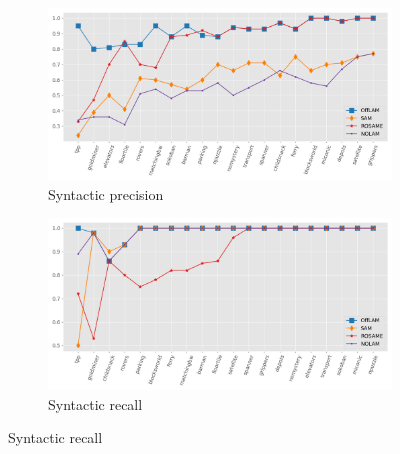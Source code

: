 
\begin{figure}[ht]
  \centering

  \begin{subfigure}[b]{0.45\textwidth}
    \includegraphics[width=\textwidth]{figures/10_traces/lineplots/syn_precision_line.png}
    \caption{Syntactic precision}
    \label{fig:syn-precision}
  \end{subfigure}
  \begin{subfigure}[b]{0.45\textwidth}
    \includegraphics[width=\textwidth]{figures/10_traces/lineplots/syn_recall_line.png}
    \caption{Syntactic recall}
  \end{subfigure}

  \vspace{1em}


\end{figure}
